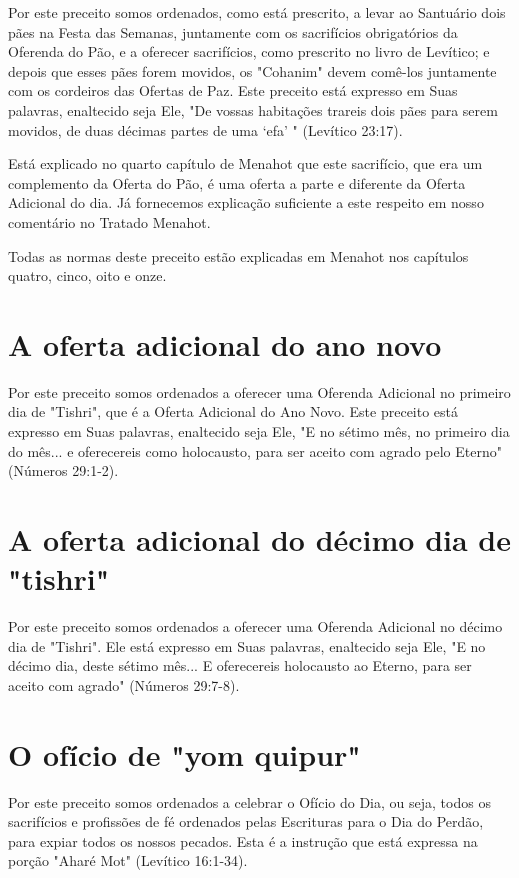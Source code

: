 \begin{itemize}
\begin{enumrate}
\begin{itemize}
\begin{itemize}
Por este preceito somos ordenados, como está prescrito, a levar ao
Santuário dois pães na Festa das Semanas, juntamente com os sacrifícios
obri­gatórios da Oferenda do Pão, e a oferecer sacrifícios, como
prescrito no livro de Levítico; e depois que esses pães forem movidos,
os "Cohanim" devem comê-los juntamente com os cordeiros das Ofertas de
Paz. Este preceito está expres­so em Suas palavras, enaltecido seja Ele,
"De vossas habitações trareis dois pães para serem movidos, de duas
décimas partes de uma `efa' " (Levítico 23:17).

Está explicado no quarto capítulo de Menahot que este sacrifício, que
era um complemento da Oferta do Pão, é uma oferta a parte e diferente da
Oferta Adicional do dia. Já fornecemos explicação suficiente a este
respeito em nosso comentário no Tratado Menahot.

Todas as normas deste preceito estão explicadas em Menahot nos capítulos
quatro, cinco, oito e onze.

\section{A oferta adicional do ano novo}

Por este preceito somos ordenados a oferecer uma Oferenda Adi­cional no
primeiro dia de "Tishri", que é a Oferta Adicional do Ano Novo. Este
preceito está expresso em Suas palavras, enaltecido seja Ele, "E no
sétimo mês, no primeiro dia do mês... e oferecereis como holocausto,
para ser aceito com agrado pelo Eterno" (Números 29:1-2).

\section{A oferta adicional do décimo dia de "tishri"}

Por este preceito somos ordenados a oferecer uma Oferenda Adi­cional no
décimo dia de "Tishri". Ele está expresso em Suas palavras, enalteci­do
seja Ele, "E no décimo dia, deste sétimo mês... E oferecereis holocausto
ao Eterno, para ser aceito com agrado" (Números 29:7-8).

\section{O ofício de "yom quipur"}

Por este preceito somos ordenados a celebrar o Ofício do Dia, ou seja,
todos os sacrifícios e profissões de fé ordenados pelas Escrituras para
o Dia do Perdão, para expiar todos os nossos pecados. Esta é a instrução
que está expressa na porção "Aharé Mot" (Levítico 16:1-34).




\end{itemize}
\end{itemize}
\end{enumrate}
\end{itemize}
